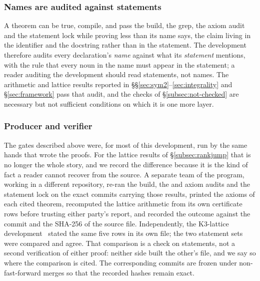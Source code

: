 \subsubsection*{Names are audited against statements}

A theorem can be true, compile, and pass the build, the  grep,
the axiom audit and the statement lock while proving less than its name says,
the claim living in the identifier and the docstring rather than in the
statement. The development therefore audits every declaration's \emph{name}
against what its \emph{statement} mentions, with the rule that every noun in
the name must appear in the statement; a reader auditing the development
should read statements, not names. The arithmetic and lattice results reported
in \S\S\ref{sec:sym2}--\ref{sec:integrality} and \S\ref{sec:framework} pass
that audit, and the checks of \S\ref{subsec:not-checked} are necessary but not
sufficient conditions on which it is one more layer.

\subsubsection*{Producer and verifier}

The gates described above were, for most of this development, run by the same
hands that wrote the proofs. For the lattice results of
\S\ref{subsec:rankjump} that is no longer the whole story, and we record the
difference because it is the kind of fact a reader cannot recover from the
source. A separate team of the program, working in a different repository,
re-ran the build, the  and axiom audits and the statement lock
on the exact commits carrying those results, printed the axioms of each cited
theorem, recomputed the lattice arithmetic from its own certificate rows
before trusting either party's report, and recorded the outcome against the
commit and the SHA-256 of the source file. Independently, the K3-lattice
development~\cite{LeanMaster2026} stated the same five rows in its own file;
the two statement sets were compared and agree. That comparison is a check on
statements, not a second verification of either proof: neither side built the
other's file, and we say so where the comparison is cited. The corresponding
commits are frozen under non-fast-forward merges so that the recorded hashes
remain exact.

